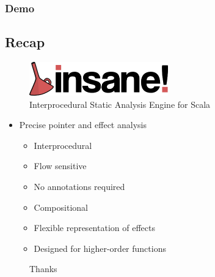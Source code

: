 \documentclass[hyperref={pdfpagelabels=false}]{beamer}
\begin{document}
%
%

\begin{frame}[fragile]
\frametitle{Demo}
\end{frame}

\subsection{Recap}
\begin{frame}[label=overview]
    \begin{figure}[t]
        \includegraphics[width=60mm]{../../../logo.png}\\
        Interprocedural Static Analysis Engine for Scala
    \end{figure}

    \begin{itemize}
        \item Precise pointer and effect analysis
            \begin{itemize}
                \item Interprocedural
                \item Flow sensitive
                \item No annotations required
                \item Compositional
                \item Flexible representation of effects
                \item Designed for higher-order functions
            \end{itemize}
    \end{itemize}
\end{frame}
\begin{frame}[fragile]
    \begin{figure}
    \begin{center}
    Thanks
    \end{center}
    \end{figure}
\end{frame}
\appendix
{}
\setcounter{finalframe}{\value{framenumber}}
\end{document}
